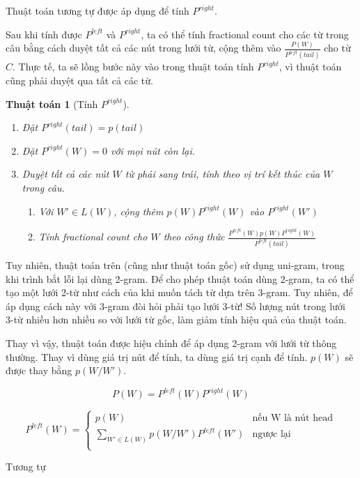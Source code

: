 \documentclass[a4paper,oneside]{book} %
\theoremstyle{break}
\newtheorem{algo}{Thuật toán}
\begin{document}
Thuật toán tương tự được áp dụng để tính $P^{right}$.

Sau khi tính được $P^{left}$ và $P^{right}$, ta có thể tính fractional
count cho các từ trong câu bằng cách duyệt tất cả các nút trong lưới từ,
cộng thêm vào $\displaystyle\frac{P(W)}{P^{left}(tail)}$ cho từ
$C$. Thực tế, ta sẽ lồng bước này vào trong thuật toán tính
$P^{right}$, vì thuật toán cũng phải duyệt qua tất cả các từ.

\begin{algo}[Tính $P^{right}$]
\begin{enumerate}
\item Đặt $P^{right}(tail) = p(tail)$
\item Đặt $P^{right}(W) = 0$ với mọi nút còn lại.
\item Duyệt tất cả các nút $W$ từ phải sang trái, tính theo vị trí kết
  thúc của $W$ trong câu.
  \begin{enumerate}
  \item Với $W' \in L(W)$, cộng thêm $p(W)P^{right}(W)$ vào
    $P^{right}(W')$
  \item Tính fractional count cho $W$ theo công thức
    $\displaystyle\frac{P^{left}(W)p(W)P^{right}(W)}{P^{left}(tail)}$
  \end{enumerate}
\end{enumerate}
\end{algo}


Tuy nhiên, thuật toán trên (cũng như thuật toán gốc) sử dụng
uni-gram, trong khi trình bắt lỗi lại dùng 2-gram. Để cho phép thuật
toán dùng 2-gram, ta có thể tạo một lưới 2-từ như cách của
\cite{Ravishankar} khi muốn tách từ dựa trên 3-gram. Tuy nhiên, để áp
dụng cách này với 3-gram đòi hỏi phải tạo lưới 3-từ! Số lượng nút
trong lưới 3-từ nhiều hơn nhiều so với lưới từ gốc, làm giảm tính hiệu
quả của thuật toán. 

Thay vì vậy, thuật toán được hiệu chỉnh để áp dụng 2-gram với lưới từ
thông thường. Thay vì dùng giá trị nút để tính, ta dùng giá trị cạnh
để tính. $p(W)$ sẽ được thay bằng $p(W/W')$.

$$P(W)=P^{left}(W)P^{right}(W)$$

$$
P^{left}(W) = \left\{
    \begin{array}{ll}
      p(W)&\text{nếu W là nút head}\\
      \displaystyle\sum_{W' \in L(W)}p(W/W')P^{left}(W')&\text{ngược lại}\\
    \end{array}
  \right.
$$

Tương tự
\end{document}
